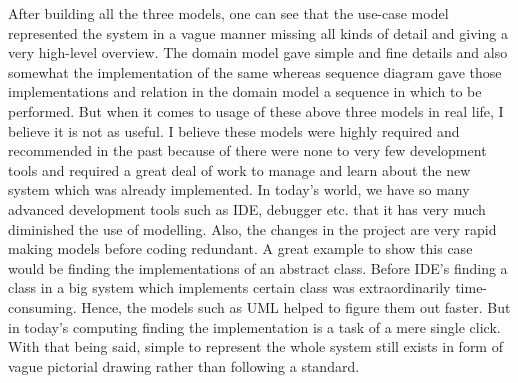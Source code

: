 After building all the three models, one can see that the use-case model represented the system in a vague manner missing all kinds of detail and giving a very high-level overview. The domain model gave simple and fine details and also somewhat the implementation of the same whereas sequence diagram gave those implementations and relation in the domain model a sequence in which to be performed. But when it comes to usage of these above three models in real life, I believe it is not as useful. I believe these models were highly required and recommended in the past because of there were none to very few development tools and required a great deal of work to manage and learn about the new system which was already implemented. In today's world, we have so many advanced development tools such as IDE, debugger etc. that it has very much diminished the use of modelling. Also, the changes in the project are very rapid making models before coding redundant. A great example to show this case would be finding the implementations of an abstract class. Before IDE's finding a class in a big system which implements certain class was extraordinarily time-consuming. Hence, the models such as UML helped to figure them out faster. But in today's computing finding the implementation is a task of a mere single click. With that being said, simple to represent the whole system still exists in form of vague pictorial drawing rather than following a standard.

